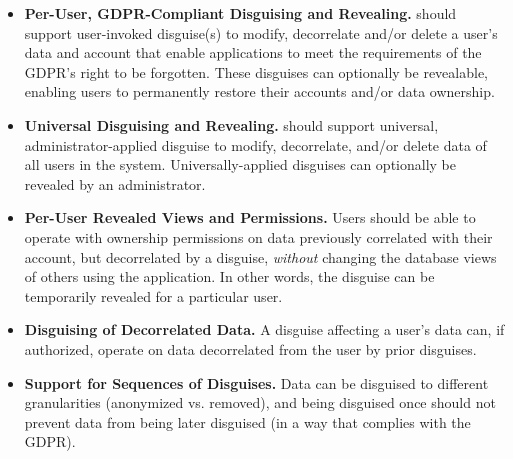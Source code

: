 \begin{itemize}
    \item\textbf{Per-User, GDPR-Compliant Disguising and Revealing.}
\sys should support user-invoked disguise(s) to modify, decorrelate and/or delete a user's data and
account that enable applications to meet the requirements of the GDPR's right to be forgotten.
%
These disguises can optionally be revealable, enabling users to \eg permanently restore their accounts and/or data ownership.

\item\textbf{Universal Disguising and Revealing.}
\sys should support universal, administrator-applied disguise to modify, decorrelate, and/or delete
        data of all users in the system.
%
Universally-applied disguises can optionally be revealed by an administrator.

\item\textbf{Per-User Revealed Views and Permissions.}
Users should be able to operate with ownership permissions on data previously correlated with their
account, but decorrelated by a disguise, \emph{without} changing the database views of others using
the application. In other words, the disguise can be temporarily revealed for a particular user.

\item\textbf{Disguising of Decorrelated Data.}
A disguise affecting a user's data can, if authorized, operate on data decorrelated from the user by
prior disguises.

\item\textbf{Support for Sequences of Disguises.}
Data can be disguised to different granularities (\eg anonymized vs. removed), and being disguised
once should not prevent data from being later disguised (in a way that complies with the GDPR).
\end{itemize}


